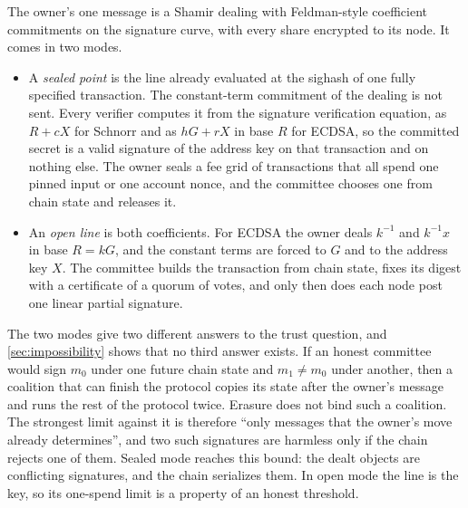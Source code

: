 The owner's one message is a Shamir dealing with Feldman-style coefficient commitments on the signature curve, with every share encrypted to its node. It comes in two modes.

\begin{itemize}[leftmargin=1.5em]
\item A \emph{sealed point} is the line already evaluated at the sighash of one fully specified transaction. The constant-term commitment of the dealing is not sent. Every verifier computes it from the signature verification equation, as $R + cX$ for Schnorr and as $hG + rX$ in base $R$ for ECDSA, so the committed secret is a valid signature of the address key on that transaction and on nothing else. The owner seals a fee grid of transactions that all spend one pinned input or one account nonce, and the committee chooses one from chain state and releases it.
\item An \emph{open line} is both coefficients. For ECDSA the owner deals $k^{-1}$ and $k^{-1}x$ in base $R = kG$, and the constant terms are forced to $G$ and to the address key $X$. The committee builds the transaction from chain state, fixes its digest with a certificate of a quorum of votes, and only then does each node post one linear partial signature.
\end{itemize}

The two modes give two different answers to the trust question, and \cref{sec:impossibility} shows that no third answer exists. If an honest committee would sign $m_0$ under one future chain state and $m_1 \neq m_0$ under another, then a coalition that can finish the protocol copies its state after the owner's message and runs the rest of the protocol twice. Erasure does not bind such a coalition. The strongest limit against it is therefore ``only messages that the owner's move already determines'', and two such signatures are harmless only if the chain rejects one of them. Sealed mode reaches this bound: the dealt objects are conflicting signatures, and the chain serializes them. In open mode the line is the key, so its one-spend limit is a property of an honest threshold.

